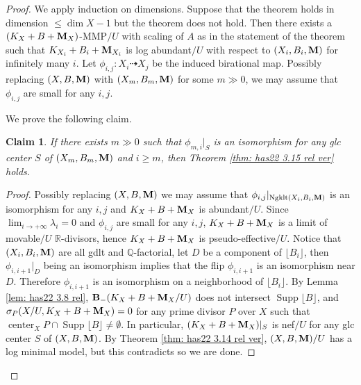 \documentclass[11pt]{amsart}
\numberwithin{equation}{section}
\newcommand{\Mm}{{\bf{M}}}
\newcommand{\Qq}{\mathbb{Q}}
\newcommand{\Rr}{\mathbb{R}}
\newcommand{\Center}{\operatorname{center}}
\newcommand{\Supp}{\operatorname{Supp}}
\newcommand{\Ngklt}{\operatorname{Ngklt}}
\newcommand{\lf}{\lfloor}
\newcommand{\rf}{\rfloor}
\newtheorem{claim}[thm]{Claim}
\theoremstyle{definition}
\theoremstyle{definition}
\theoremstyle{definition}
\begin{document}
\begin{proof} We apply induction on dimensions. Suppose that the theorem holds in dimension $\leq \dim X-1$ but the theorem does not hold. Then there exists a $(K_{X}+B+\Mm_{X})$-MMP$/U$ with scaling of $A$ as in the statement of the theorem such that  $K_{X_i}+B_i+\Mm_{X_i}$ is log abundant$/U$ with respect to $(X_i,B_i,\Mm)$ for infinitely many $i$. Let $\phi_{i,j}: X_i\dashrightarrow X_j$ be the induced birational map. Possibly replacing $(X,B,\Mm)$ with $(X_m,B_m,\Mm)$ for some $m\gg 0$, we may assume that $\phi_{i,j}$ are small for any $i,j$. 

We prove the following claim.

\begin{claim}\label{claim: has20 3.4 step 2 gpair rel}
If there exists $m\gg 0$ such that $\phi_{m,i}|_S$ is an isomorphism for any glc center $S$ of $(X_m,B_m,\Mm)$ and $i\geq m$, then Theorem \ref{thm: has22 3.15 rel ver} holds.
\end{claim}
\begin{proof}
Possibly replacing $(X,B,\Mm)$ we may assume that $\phi_{i,j}|_{\Ngklt(X_i,B_i,\Mm)}$ is an isomorphism for any $i,j$ and $K_X+B+\Mm_X$ is abundant$/U$. Since $\lim_{i\rightarrow+\infty}\lambda_i=0$ and $\phi_{i,j}$ are small for any $i,j$, $K_X+B+\Mm_X$ is a limit of movable$/U$ $\Rr$-divisors, hence $K_X+B+\Mm_X$ is pseudo-effective$/U$. Notice that $(X_i,B_i,\Mm)$ are all gdlt and $\Qq$-factorial, let $D$ be a component of $\lf B_i\rf$, then $\phi_{i,i+1}|_D$ being an isomorphism implies that the flip $\phi_{i,i+1}$ is an isomorphism near $D$. Therefore $\phi_{i,i+1}$ is an isomorphism on a neighborhood of $\lf B_i\rf$. By Lemma \ref{lem: has22 3.8 rel}, ${\bf B}_{-}(K_{X}+B+\Mm_{X}/U)$ does not intersect $\Supp\lfloor B\rfloor$, and $\sigma_P(X/U,K_X+B+\Mm_X)=0$ for any prime divisor $P$ over $X$ such that $\Center_XP\cap\Supp\lfloor B\rfloor\not=\emptyset$. In particular, $(K_X+B+\Mm_X)|_S$ is nef$/U$ for any glc center $S$ of $(X,B,\Mm)$. By Theorem \ref{thm: has22 3.14 rel ver}, $(X,B,\Mm)/U$ has a log minimal model, but this contradicts \cite[Theorem 4.1]{HL18} so we are done.
\end{proof}


\end{proof}
\end{document}
